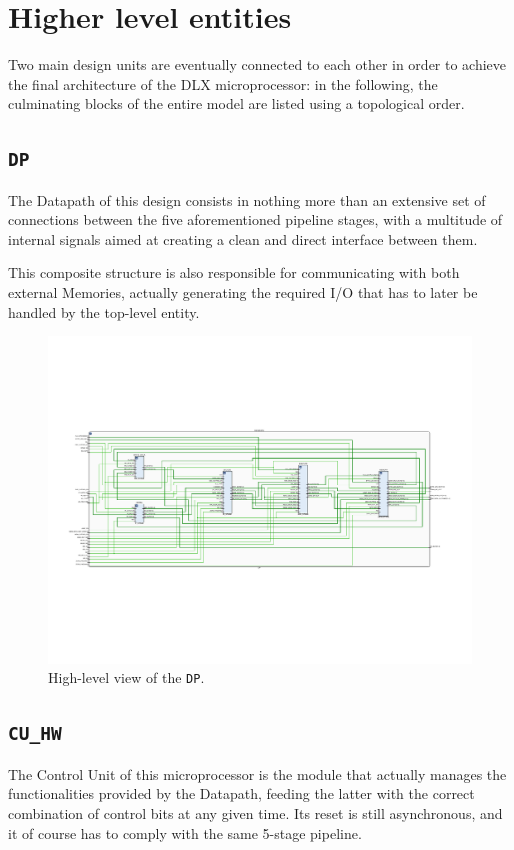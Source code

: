\section{Higher level entities}
Two main design units are eventually connected to each other in order to achieve the final architecture of the DLX microprocessor: in the following, the culminating blocks of the entire model are listed using a topological order.

\subsection{\texttt{DP}}
The Datapath of this design consists in nothing more than an extensive set of connections between the five aforementioned pipeline stages, with a multitude of internal signals aimed at creating a clean and direct interface between them.

This composite structure is also responsible for communicating with both external Memories, actually generating the required I/O that has to later be handled by the top-level entity.

\begin{figure}[!ht]
\centering
\includegraphics[width=\textwidth]{./chapters/figures/DP.pdf} 
\caption{High-level view of the \texttt{DP}.}
\end{figure}

\subsection{\texttt{CU\_HW}}
The Control Unit of this microprocessor is the module that actually manages the functionalities provided by the Datapath, feeding the latter with the correct combination of control bits at any given time. Its reset is still asynchronous, and it of course has to comply with the same 5-stage pipeline.

